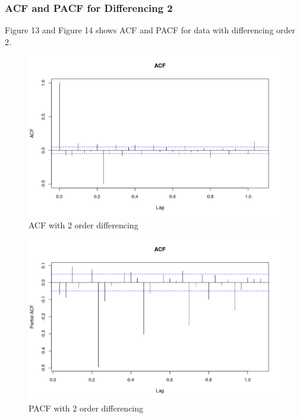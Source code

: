 \documentclass{article}
\begin{document}
\subsubsection{ACF and PACF for Differencing 2}

Figure 13 and Figure 14 shows ACF and PACF for data with differencing order 2.

\begin{figure}[ht]
	\centering
	\includegraphics[scale=0.25]{images/ts_images/ACFWith2Differencing.png}
	\caption{ACF with 2 order differencing}
	\label{fig: ACF with 2 order differencing}
\end{figure}

\begin{figure}[ht]
	\centering
	\includegraphics[scale=0.25]{images/ts_images/PACFWith2Differencing.png}
	\caption{PACF with 2 order differencing}
	\label{fig: PACF with 2 order differencing}
\end{figure}
\end{document}

